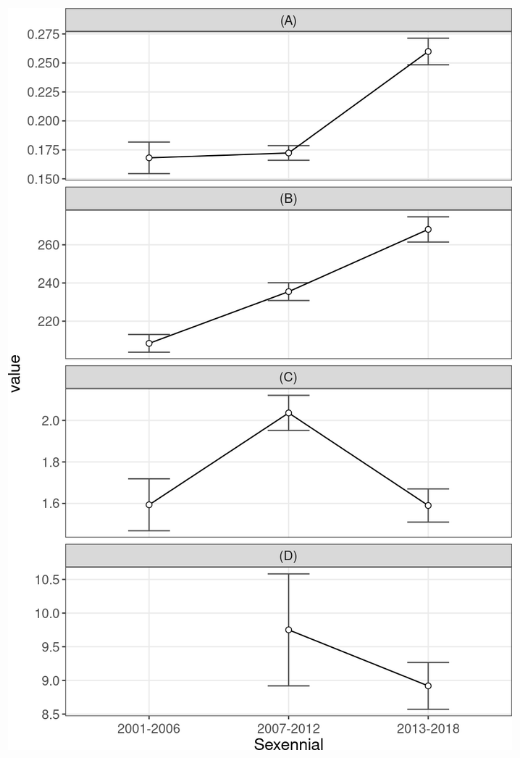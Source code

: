 \documentclass[10pt,landscape,a3paper]{article}
\begin{document}
\begin{center}\includegraphics{img/modelling/aa-eda-ts-17} \end{center}
\end{document}
